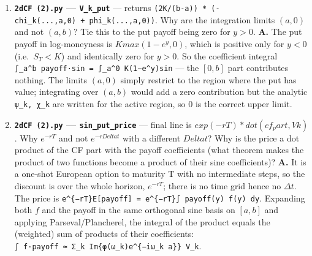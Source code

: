 \documentclass[
  11pt,
]{article}
\begin{document}
\begin{enumerate}
  report's \(ψ_k\) (the bare-sine integral). The code's \(chi_k\)
  computes \texttt{∫\_c\^{}d\ e\^{}y\ sin(ω\_k(y−a))\ dy} via the
  standard \texttt{e\^{}y(sin\ −\ ω\_k\ cos)/(1+ω\_k²)} antiderivative
  --- that matches the report's \(χ_k\). For a put, intrinsic
  \(K − S = K(1 − e^y)\) on \(y<0\), so
  \texttt{V\_k\ ∝\ ∫(K\ −\ Ke\^{}y)sin(...)\ =\ K(ψ\_k\ −\ χ\_k)};
  \texttt{V\_k\_put} returns \texttt{(2K/(b−a))(−χ\_k\ +\ ψ\_k)},
  i.e.~\texttt{K(ψ\_k\ −\ χ\_k)} --- correctly paired. The name
  \(phi_k\) is unfortunate because \(phi\)/\(phi_BS\) already denote the
  characteristic function; the local \(phi_k\) is a payoff-integral,
  conceptually unrelated, so the clash is purely cosmetic naming, not a
  bug. \emph{(confirm this matches your own reasoning/observation)}
\item
  \textbf{\texttt{2dCF\ (2).py} --- \texttt{V\_k\_put}} --- returns
  \texttt{(2K/(b-a))\ *\ (-chi\_k(...,a,0)\ +\ phi\_k(...,a,0))}. Why
  are the integration limits \((a, 0)\) and not \((a, b)\)? Tie this to
  the put payoff being zero for \(y > 0\). \textbf{A.} The put payoff in
  log-moneyness is \(K max(1 − e^y, 0)\), which is positive only for
  \(y < 0\) (i.e.~\(S_T < K\)) and identically zero for \(y > 0\). So
  the coefficient integral
  \texttt{∫\_a\^{}b\ payoff·sin\ =\ ∫\_a\^{}0\ K(1−e\^{}y)sin} --- the
  \([0,b]\) part contributes nothing. The limits \((a, 0)\) simply
  restrict to the region where the put has value; integrating over
  \((a,b)\) would add a zero contribution but the analytic
  \texttt{ψ\_k,\ χ\_k} are written for the active region, so \(0\) is
  the correct upper limit.
\item
  \textbf{\texttt{2dCF\ (2).py} --- \texttt{sin\_put\_price}} --- final
  line is \(exp(-rT) * dot(cf_part, Vk)\). Why \(e^{-rT}\) and not
  \(e^{-r Delta t}\) with a different \(Delta t\)? Why is the price a
  dot product of the CF part with the payoff coefficients (what theorem
  makes the product of two functions become a product of their sine
  coefficients)? \textbf{A.} It is a one-shot European option to
  maturity T with no intermediate steps, so the discount is over the
  whole horizon, \(e^{−rT}\); there is no time grid hence no \(Δt\). The
  price is
  \texttt{e\^{}\{−rT\}E{[}payoff{]}\ =\ e\^{}\{−rT\}∫\ payoff(y)\ f(y)\ dy}.
  Expanding both \(f\) and the payoff in the same orthogonal sine basis
  on \([a,b]\) and applying Parseval/Plancherel, the integral of the
  product equals the (weighted) sum of products of their coefficients:
  \texttt{∫\ f·payoff\ ≈\ Σ\_k\ Im\{φ(ω\_k)e\^{}\{−iω\_k\ a\}\}\ V\_k}.

\end{enumerate}
\end{document}
